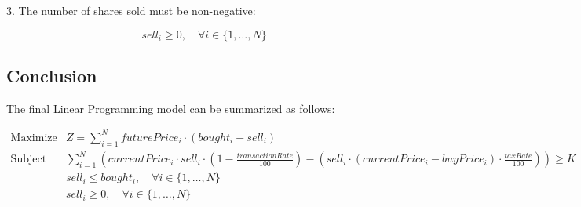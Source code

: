 \documentclass{article}
\begin{document}
3. The number of shares sold must be non-negative:

\[
sell_i \geq 0, \quad \forall i \in \{1, \ldots, N\}
\]

\subsection*{Conclusion}
The final Linear Programming model can be summarized as follows:

\[
\begin{array}{ll}
\text{Maximize} & Z = \sum_{i=1}^{N} futurePrice_i \cdot (bought_i - sell_i) \\
\text{Subject to} & \sum_{i=1}^{N} \left( currentPrice_i \cdot sell_i \cdot (1 - \frac{transactionRate}{100}) - (sell_i \cdot (currentPrice_i - buyPrice_i) \cdot \frac{taxRate}{100}) \right) \geq K \\
& sell_i \leq bought_i, \quad \forall i \in \{1, \ldots, N\} \\
& sell_i \geq 0, \quad \forall i \in \{1, \ldots, N\}
\end{array}
\]
\end{document}
